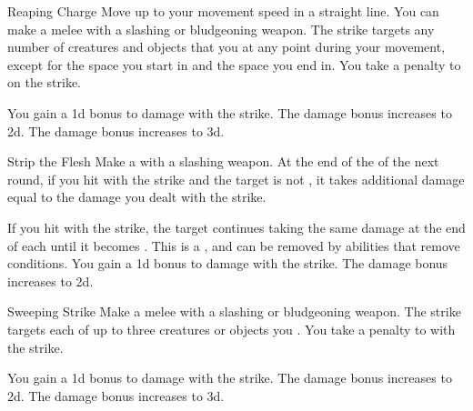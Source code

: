 {            \begin{apability}{Reaping Charge}
                Move up to your movement speed in a straight line.
                You can make a melee  with a slashing or bludgeoning weapon.
                The strike targets any number of creatures and objects that you  at any point during your movement, except for the space you start in and the space you end in.
                You take a  penalty to  on the strike.

                \rankline
                 You gain a \plus1d bonus to damage with the strike.
                 The damage bonus increases to \plus2d.
                 The damage bonus increases to \plus3d.
            \end{apability}

            \begin{apability}{Strip the Flesh}
                Make a  with a slashing weapon.
                At the end of the  of the next round, if you hit with the strike and the target is not , it takes additional damage equal to the damage you dealt with the strike.

                \rankline
                 If you hit with the strike, the target continues taking the same damage at the end of each  until it becomes .
                This is a , and can be removed by abilities that remove conditions.
                 You gain a \plus1d bonus to damage with the strike.
                 The damage bonus increases to \plus2d.
            \end{apability}

            \begin{apability}{Sweeping Strike}
                Make a melee  with a slashing or bludgeoning weapon.
                The strike targets each of up to three creatures or objects you .
                You take a  penalty to  with the strike.

                \rankline
                 You gain a \plus1d bonus to damage with the strike.
                 The damage bonus increases to \plus2d.
                 The damage bonus increases to \plus3d.
            \end{apability}

}
